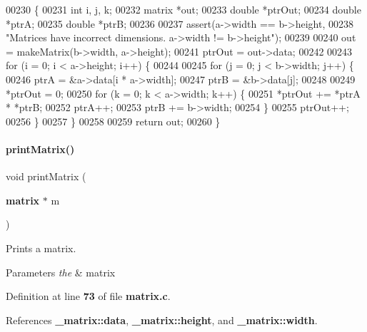 \begin{DoxyCode}
00230                                              \{
00231   \textcolor{keywordtype}{int} i, j, k;
00232   matrix *out;
00233   \textcolor{keywordtype}{double} *ptrOut;
00234   \textcolor{keywordtype}{double} *ptrA;
00235   \textcolor{keywordtype}{double} *ptrB;
00236 
00237   assert(a->width == b->height,
00238          \textcolor{stringliteral}{"Matrices have incorrect dimensions. a->width != b->height"});
00239 
00240   out = makeMatrix(b->width, a->height);
00241   ptrOut = out->data;
00242 
00243   \textcolor{keywordflow}{for} (i = 0; i < a->height; i++) \{
00244 
00245     \textcolor{keywordflow}{for} (j = 0; j < b->width; j++) \{
00246       ptrA = &a->data[i * a->width];
00247       ptrB = &b->data[j];
00248 
00249       *ptrOut = 0;
00250       \textcolor{keywordflow}{for} (k = 0; k < a->width; k++) \{
00251         *ptrOut += *ptrA * *ptrB;
00252         ptrA++;
00253         ptrB += b->width;
00254       \}
00255       ptrOut++;
00256     \}
00257   \}
00258 
00259   \textcolor{keywordflow}{return} out;
00260 \}
\end{DoxyCode}
\mbox{\label{a00125_a50ab2b1ac33d6993d93522fc4f30a051}} 
\paragraph{print\+Matrix()}
{\footnotesize\ttfamily void print\+Matrix (\begin{DoxyParamCaption}\item[{\textbf{ matrix} $\ast$}]{m }\end{DoxyParamCaption})}



Prints a matrix. 


\begin{DoxyParams}{Parameters}
{\em the} & matrix \\
\hline
\end{DoxyParams}


Definition at line \textbf{ 73} of file \textbf{ matrix.\+c}.



References \textbf{ \+\_\+matrix\+::data}, \textbf{ \+\_\+matrix\+::height}, and \textbf{ \+\_\+matrix\+::width}.


\mbox{\label{a00125_acdd57777a972ce339153878fa917db14}} 
